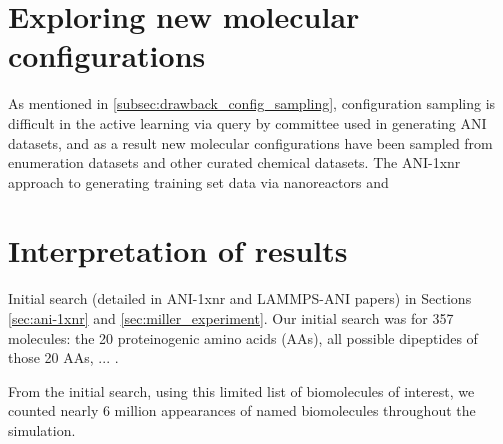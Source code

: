 \section{Exploring new molecular configurations}
\label{sec:exploring_new_mol_configs}
As mentioned in \ref{subsec:drawback_config_sampling},
\hypertarget{configurational_sampling}{configuration sampling}
is difficult in the active learning via query by committee used in generating ANI datasets, and as a result new molecular configurations have been sampled from enumeration datasets and other curated chemical datasets.
The ANI-1xnr \cite{ani-1xnr} approach to generating training set data via nanoreactors and 


\section{Interpretation of results}
\label{sec:hero_run_interpretation}

Initial search (detailed in ANI-1xnr and LAMMPS-ANI papers) in Sections \ref{sec:ani-1xnr} and \ref{sec:miller_experiment}.
Our initial search was for 357 molecules: the 20 proteinogenic amino acids (AAs), all possible dipeptides of those 20 AAs, ... .

From the initial search, using this limited list of biomolecules of interest, we counted nearly 6 million appearances of named biomolecules throughout the simulation.

